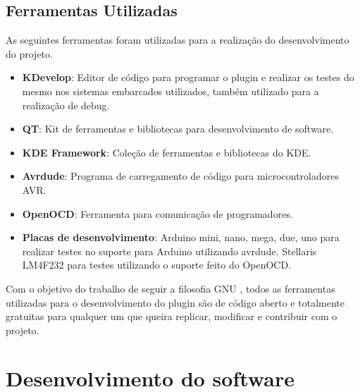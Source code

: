 \subsection{Ferramentas Utilizadas}
As seguintes ferramentas foram utilizadas para a realização do desenvolvimento do projeto.
\begin{itemize}
 \item \textbf{KDevelop}: Editor de código para programar o plugin e realizar os testes do mesmo nos sistemas embarcados utilizados, também utilizado para a realização de debug.
 \item \textbf{QT}: Kit de ferramentas e bibliotecas para desenvolvimento de software.
 \item \textbf{KDE Framework}: Coleção de ferramentas e bibliotecas do KDE.
 \item \textbf{Avrdude}: Programa de carregamento de código para microcontroladores AVR.
 \item \textbf{OpenOCD}: Ferramenta para comunicação de programadores.
 \item \textbf{Placas de desenvolvimento}: Arduino mini, nano, mega, due, uno para realizar testes no suporte para Arduino utilizando avrdude. Stellaris LM4F232 para testes utilizando o suporte feito do OpenOCD.
\end{itemize}

Com o objetivo do trabalho de seguir a filosofia GNU \cite{filosofia}, todos as ferramentas utilizadas para o desenvolvimento do plugin são de código aberto e totalmente gratuitas para qualquer um que queira replicar, modificar e contribuir com o projeto.

\section{Desenvolvimento do software}

